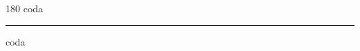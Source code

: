 
\begin{frame}
\begin{center}
\begin{turn}{180}
{\fontsize{2.5cm}{1em}\selectfont coda}
\end{turn}
\vspace{1em}\par  
\hrule
\vspace{1em}\par  
{\fontsize{2.5cm}{1em}\selectfont coda}
\end{center}
\end{frame}
